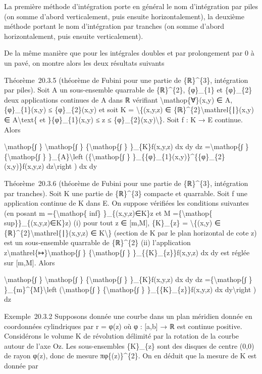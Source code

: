 \documentclass[]{article}
\begin{document}
La première méthode d'intégration porte en général le nom d'intégration
par piles (on somme d'abord verticalement, puis ensuite
horizontalement), la deuxième méthode portant le nom d'intégration par
tranches (on somme d'abord horizontalement, puis ensuite verticalement).

De la même manière que pour les intégrales doubles et par prolongement
par 0 à un pavé, on montre alors les deux résultats suivants

Théorème~20.3.5 (théorème de Fubini pour une partie de \{ℝ\}\^{}\{3\},
intégration par piles). Soit A un sous-ensemble quarrable de
\{ℝ\}\^{}\{2\}, \{φ\}\_\{1\} et \{φ\}\_\{2\} deux applications continues
de A dans ℝ vérifiant \textbackslash{}mathop\{∀\}(x,y) ∈ A,
\{φ\}\_\{1\}(x,y) ≤ \{φ\}\_\{2\}(x,y) et soit K =
\textbackslash{}\{(x,y,z) ∈
\{ℝ\}\^{}\{2\}\textbackslash{}mathrel\{∣\}(x,y) ∈
A\textbackslash{}text\{ et \}\{φ\}\_\{1\}(x,y) ≤ z ≤
\{φ\}\_\{2\}(x,y)\textbackslash{}\}. Soit f : K → E continue. Alors

\textbackslash{}mathop\{∫ \} \textbackslash{}mathop\{∫ \}
\{\textbackslash{}mathop\{∫ \} \}\_\{K\}f(x,y,z) dx dy dz
=\textbackslash{}mathop\{∫ \} \{\textbackslash{}mathop\{∫ \}
\}\_\{A\}\textbackslash{}left (\{\textbackslash{}mathop\{∫ \}
\}\_\{\{φ\}\_\{1\}(x,y)\}\^{}\{\{φ\}\_\{2\}(x,y)\}f(x,y,z)
dz\textbackslash{}right ) dx dy

Théorème~20.3.6 (théorème de Fubini pour une partie de \{ℝ\}\^{}\{3\},
intégration par tranches). Soit K une partie de \{ℝ\}\^{}\{3\} compacte
et quarrable. Soit f une application continue de K dans E. On suppose
vérifiées les conditions suivantes (en posant m
=\{\textbackslash{}mathop\{ inf\} \}\_\{(x,y,z)∈K\}z et M
=\{\textbackslash{}mathop\{ sup\}\}\_\{(x,y,z)∈K\}z) (i) pour tout z ∈
{[}m,M{]}, \{K\}\_\{z\} = \textbackslash{}\{(x,y) ∈
\{ℝ\}\^{}\{2\}\textbackslash{}mathrel\{∣\}(x,y,z) ∈ K\textbackslash{}\}
(section de K par le plan horizontal de cote z) est un sous-ensemble
quarrable de \{ℝ\}\^{}\{2\} (ii) l'application
z\textbackslash{}mathrel\{↦\}\textbackslash{}mathop\{∫ \}
\{\textbackslash{}mathop\{∫ \} \}\_\{\{K\}\_\{z\}\}f(x,y,z) dx dy est
réglée sur {[}m,M{]}. Alors

\textbackslash{}mathop\{∫ \} \textbackslash{}mathop\{∫ \}
\{\textbackslash{}mathop\{∫ \} \}\_\{K\}f(x,y,z) dx dy dz
=\{\textbackslash{}mathop\{∫ \} \}\_\{m\}\^{}\{M\}\textbackslash{}left
(\textbackslash{}mathop\{∫ \} \{\textbackslash{}mathop\{∫ \}
\}\_\{\{K\}\_\{z\}\}f(x,y,z) dx dy\textbackslash{}right ) dz

Exemple~20.3.2 Supposons donnée une courbe dans un plan méridien donnée
en coordonnées cylindriques par r = φ(z) où φ : {[}a,b{]} → ℝ est
continue positive. Considérons le volume K de révolution délimité par la
rotation de la courbe autour de l'axe Oz. Les sous-ensembles
\{K\}\_\{z\} sont des disques de centre (0,0) de rayon φ(z), donc de
mesure πφ\{(z)\}\^{}\{2\}. On en déduit que la mesure de K est donnée
par
\end{document}
